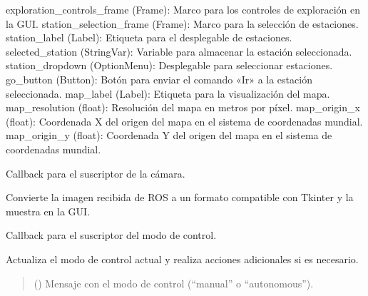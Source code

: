 \documentclass[a4paper,10pt,spanish]{sphinxmanual}
\begin{document}
\begin{fulllineitems}
\begin{description}
exploration\_controls\_frame (Frame): Marco para los controles de exploración en la GUI.
station\_selection\_frame (Frame): Marco para la selección de estaciones.
station\_label (Label): Etiqueta para el desplegable de estaciones.
selected\_station (StringVar): Variable para almacenar la estación seleccionada.
station\_dropdown (OptionMenu): Desplegable para seleccionar estaciones.
go\_button (Button): Botón para enviar el comando «Ir» a la estación seleccionada.
map\_label (Label): Etiqueta para la visualización del mapa.
map\_resolution (float): Resolución del mapa en metros por píxel.
map\_origin\_x (float): Coordenada X del origen del mapa en el sistema de coordenadas mundial.
map\_origin\_y (float): Coordenada Y del origen del mapa en el sistema de coordenadas mundial.

\end{description}

\begin{fulllineitems}
\label{\detokenize{squad_state_manager:squad_interfaz.InterfazManager.camera_callback}}
\pysigstartsignatures
{}
\pysigstopsignatures
\sphinxAtStartPar
Callback para el suscriptor de la cámara.

\sphinxAtStartPar
Convierte la imagen recibida de ROS a un formato compatible con Tkinter y la
muestra en la GUI.

\end{fulllineitems}


\begin{fulllineitems}
\label{\detokenize{squad_state_manager:squad_interfaz.InterfazManager.control_mode_callback}}
\pysigstartsignatures
{}
\pysigstopsignatures
\sphinxAtStartPar
Callback para el suscriptor del modo de control.

\sphinxAtStartPar
Actualiza el modo de control actual y realiza acciones adicionales si es necesario.
\begin{quote}\begin{description}
\sphinxAtStartPar
{} () \textendash{} Mensaje con el modo de control (“manual” o “autonomous”).


\end{description}
\end{quote}
\end{fulllineitems}
\end{fulllineitems}
\end{document}
